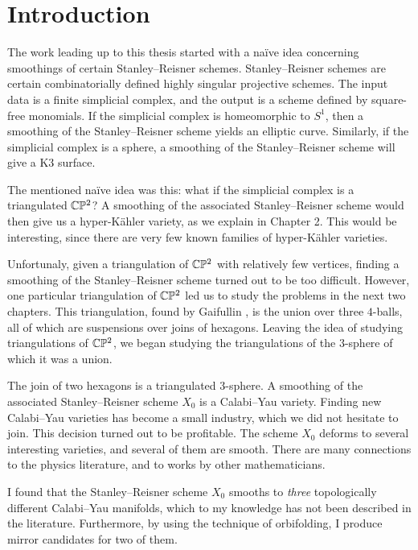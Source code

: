 \chapter{Introduction}
\label{sec:intro}

The work leading up to this thesis started with a naïve idea concerning smoothings of certain Stanley--Reisner schemes. Stanley--Reisner schemes are certain combinatorially defined highly singular projective schemes. The input data is a finite simplicial complex, and the output is a scheme defined by square-free monomials. If the simplicial complex is homeomorphic to $S^1$, then a smoothing of the Stanley--Reisner scheme yields an elliptic curve. Similarly, if the simplicial complex is a sphere, a smoothing of the Stanley--Reisner scheme will give a K3 surface.

The mentioned naïve idea was this: what if the simplicial complex is a triangulated $\mathbb{C} \mathbb{P}^2$? A smoothing of the associated Stanley--Reisner scheme would then give us a hyper-Kähler variety, as we explain in Chapter 2. This would be interesting, since there are very few known families of hyper-Kähler varieties.

Unfortunaly, given a triangulation of $\mathbb{C} \mathbb{P}^2$ with relatively few vertices, finding a smoothing of the Stanley--Reisner scheme turned out to be too difficult. However, one particular triangulation of $\mathbb{C} \mathbb{P}^2$ led us to study the problems in the next two chapters. This triangulation, found by Gaifullin \cite{cp2_15_chess}, is the union over three $4$-balls, all of which are suspensions over joins of hexagons. Leaving the idea of studying triangulations of $\mathbb{C} \mathbb{P}^2$, we began studying the triangulations of the $3$-sphere of which it was a union.

The join of two hexagons is a triangulated $3$-sphere. A smoothing of the associated Stanley--Reisner scheme $X_0$ is a Calabi--Yau variety. Finding new Calabi--Yau varieties has become a small industry, which we did not hesitate to join. This decision turned out to be profitable. The scheme $X_0$ deforms to several interesting varieties, and several of them are smooth. There are many connections to the physics literature, and to works by other mathematicians.

I found that the Stanley--Reisner scheme $X_0$ smooths to \emph{three} topologically different Calabi--Yau manifolds, which to my knowledge has not been described in the literature. Furthermore, by using the technique of orbifolding, I produce mirror candidates for two of them.

